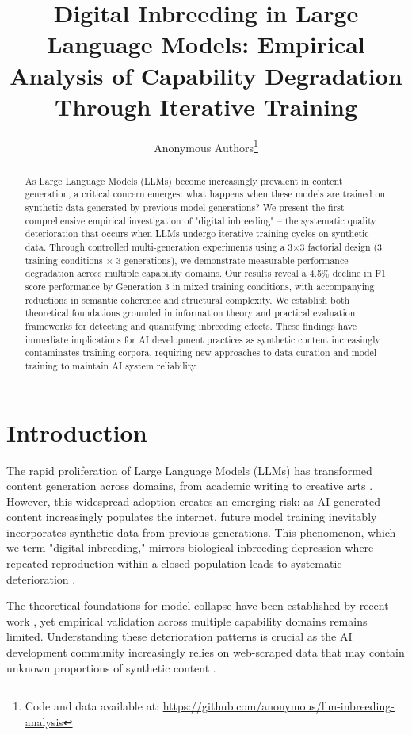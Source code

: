 \documentclass{article}
\title{Digital Inbreeding in Large Language Models: Empirical Analysis of Capability Degradation Through Iterative Training}
\author{
Anonymous Authors\thanks{Code and data available at: \url{https://github.com/anonymous/llm-inbreeding-analysis}}
}
\begin{document}
\maketitle

\begin{abstract}
As Large Language Models (LLMs) become increasingly prevalent in content generation, a critical concern emerges: what happens when these models are trained on synthetic data generated by previous model generations? We present the first comprehensive empirical investigation of "digital inbreeding" -- the systematic quality deterioration that occurs when LLMs undergo iterative training cycles on synthetic data. Through controlled multi-generation experiments using a 3×3 factorial design (3 training conditions × 3 generations), we demonstrate measurable performance degradation across multiple capability domains. Our results reveal a 4.5\% decline in F1 score performance by Generation 3 in mixed training conditions, with accompanying reductions in semantic coherence and structural complexity. We establish both theoretical foundations grounded in information theory and practical evaluation frameworks for detecting and quantifying inbreeding effects. These findings have immediate implications for AI development practices as synthetic content increasingly contaminates training corpora, requiring new approaches to data curation and model training to maintain AI system reliability.
\end{abstract}

\section{Introduction}

The rapid proliferation of Large Language Models (LLMs) has transformed content generation across domains, from academic writing to creative arts \citep{brown2020language,chowdhery2022palm}. However, this widespread adoption creates an emerging risk: as AI-generated content increasingly populates the internet, future model training inevitably incorporates synthetic data from previous generations. This phenomenon, which we term "digital inbreeding," mirrors biological inbreeding depression where repeated reproduction within a closed population leads to systematic deterioration \citep{charlesworth2009fundamental}.

The theoretical foundations for model collapse have been established by recent work \citep{shumailov2023curse,alemohammad2023self}, yet empirical validation across multiple capability domains remains limited. Understanding these deterioration patterns is crucial as the AI development community increasingly relies on web-scraped data that may contain unknown proportions of synthetic content \citep{gao2020pile}.
\end{document}
